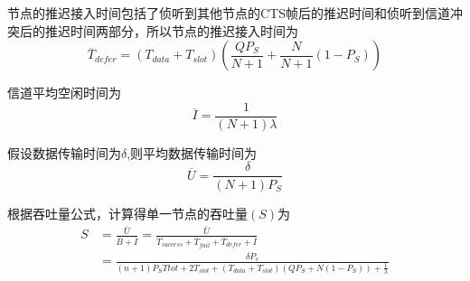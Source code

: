 节点的推迟接入时间包括了侦听到其他节点的CTS帧后的推迟时间和侦听到信道冲突后的推迟时间两部分，所以节点的推迟接入时间为
\begin{equation}
\overline T_{defer}=(T_{data}+T_{slot})(\frac{QP_S}{N+1}+\frac{N}{N+1}(1-P_S)) 
\end{equation}

信道平均空闲时间为
\begin{equation}
\overline I=\frac{1}{(N+1)\lambda}
\end{equation}

假设数据传输时间为$\delta$,则平均数据传输时间为
\begin{equation}
\overline U=\frac{\delta}{(N+1)P_S}
\end{equation}

根据吞吐量公式，计算得单一节点的吞吐量$(S)$为
\begin{equation}
\begin{aligned}
S&=\frac{\overline U}{\overline B+\overline I}=\frac{\overline U}{\overline T_{success}+\overline T_{fail}+\overline T_{defer}+\overline I}\\
&=\frac{\delta P_s}{(n+1)P_S T{tot}+2T_{slot}+(T_{data}+T_{slot})(QP_S+N(1-P_S))+\frac{1}{\lambda}}
\end{aligned}
\end{equation}

\endinput